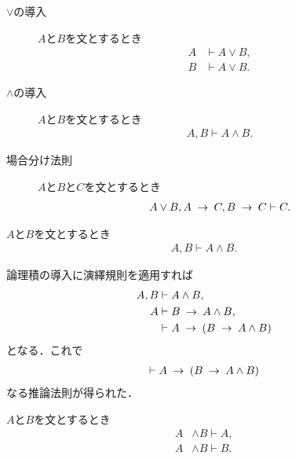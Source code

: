	\begin{description}
		\item[$\vee$の導入] $A$と$B$を文とするとき
			\begin{align}
				A &\vdash A \vee B, \\
				B &\vdash A \vee B.
			\end{align}
		
		\item[$\wedge$の導入] $A$と$B$を文とするとき
			\begin{align}
				A,B \vdash A \wedge B.
			\end{align}
			
		\item[場合分け法則] $A$と$B$と$C$を文とするとき
			\begin{align}
				A \vee B, A \hspace{0.25em}\rightarrow\hspace{0.25em} C, B \hspace{0.25em}\rightarrow\hspace{0.25em} C \vdash C.
			\end{align}
	\end{description}
	
	\begin{screen}
		\begin{logicalaxm}[論理積の導入]
		\label{logicalaxm:introduction_of_conjunction}
			$A$と$B$を文とするとき
			\begin{align}
				A,B \vdash A \wedge B.
			\end{align}
		\end{logicalaxm}
	\end{screen}
	
	論理積の導入に演繹規則を適用すれば
	\begin{align}
		A,B &\vdash A \wedge B, \\
		A &\vdash B \hspace{0.25em}\rightarrow\hspace{0.25em} A \wedge B, \\
		&\vdash A \hspace{0.25em}\rightarrow\hspace{0.25em} (B \hspace{0.25em}\rightarrow\hspace{0.25em} A \wedge B)
	\end{align}
	となる．これで
	\begin{align}
		\vdash A \hspace{0.25em}\rightarrow\hspace{0.25em} (B \hspace{0.25em}\rightarrow\hspace{0.25em} A \wedge B)
	\end{align}
	なる推論法則が得られた．
	
	\begin{screen}
		\begin{logicalaxm}[論理積の除去]
		\label{logicalaxm:elimination_of_conjunction}
			$A$と$B$を文とするとき
			\begin{align}
				A &\wedge B \vdash A, \\
				A &\wedge B \vdash B.
			\end{align}
		\end{logicalaxm}
	\end{screen}
	
